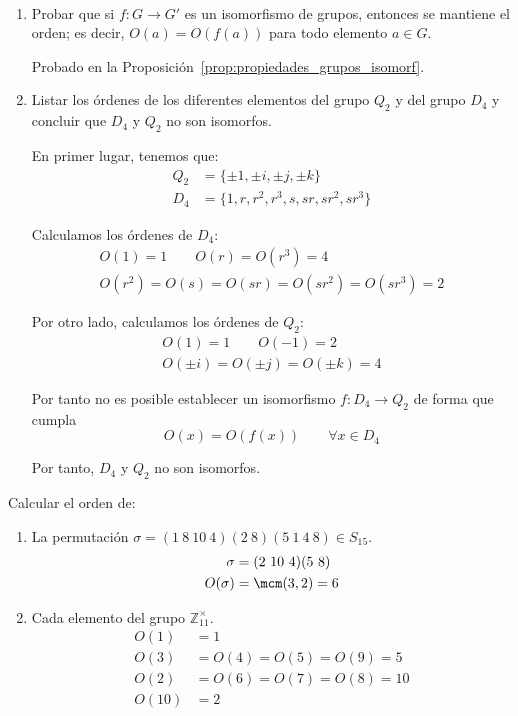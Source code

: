 \begin{ejercicio}\label{ej:2.30}~
    \begin{enumerate}
        \item Probar que si $f : G \to G'$ es un isomorfismo de grupos, entonces se mantiene el orden; es decir, $O(a) = O(f(a))$ para todo elemento $a \in G$.
        
        Probado en la Proposición~\ref{prop:propiedades_grupos_isomorf}.
        \item Listar los órdenes de los diferentes elementos del grupo $Q_2$ y del grupo $D_4$ y concluir que $D_4$ y $Q_2$ no son isomorfos.
        
        En primer lugar, tenemos que:
        \begin{align*}
            Q_2 &= \{\pm 1, \pm i, \pm j, \pm k\}\\
            D_4 &= \{1, r, r^2, r^3, s, sr, sr^2, sr^3\}
        \end{align*}

        Calculamos los órdenes de $D_4$:
        \begin{gather*}
            O(1) =1\qquad O(r)=O(r^3)=4\\
            O(r^2)=O(s)=O(sr)=O(sr^2)=O(sr^3)=2
        \end{gather*}

        Por otro lado, calculamos los órdenes de $Q_2$:
        \begin{gather*}
            O(1)=1\qquad O(-1)=2\\
            O(\pm i)=O(\pm j)=O(\pm k)=4
        \end{gather*}

        Por tanto no es posible establecer un isomorfismo $f:D_4\to Q_2$ de forma que cumpla
        \begin{equation*}
            O(x)=O(f(x))\qquad \forall x\in D_4
        \end{equation*}

        Por tanto, $D_4$ y $Q_2$ no son isomorfos.
    \end{enumerate}
\end{ejercicio}

\begin{ejercicio}\label{ej:2.31}
    Calcular el orden de:
    \begin{enumerate}
        \item La permutación $\sigma = (1\ 8\ 10\ 4)(2\ 8)(5\ 1\ 4\ 8)\in S_{15}$.
        \begin{align*}
            \sigma &= (2\ 10\ 4)(5\ 8)\\
            O(\sigma) &= \mcm(3,2)=6
        \end{align*}
        \item Cada elemento del grupo $\mathbb{Z}^{\times}_{11}$.
        \begin{align*}
            O(1)&=1\\
            O(3)&=O(4)=O(5)=O(9)=5\\
            O(2)&=O(6)=O(7)=O(8)=10\\
            O(10)&=2
        \end{align*}
    \end{enumerate}
\end{ejercicio}

